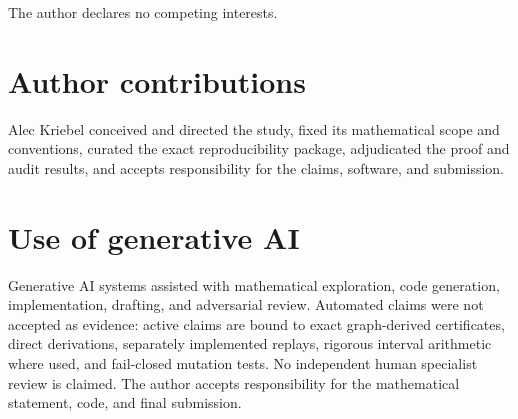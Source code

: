 \documentclass[11pt]{article}
\theoremstyle{remark}
\newcommand{\1}{\mathbf 1}
\begin{document}
The author declares no competing interests.

\section*{Author contributions}

Alec Kriebel conceived and directed the study, fixed its mathematical scope
and conventions, curated the exact reproducibility package, adjudicated the
proof and audit results, and accepts responsibility for the claims,
software, and submission.

\section*{Use of generative AI}

Generative AI systems assisted with mathematical exploration, code
generation, implementation, drafting, and adversarial review.  Automated
claims were not accepted as evidence: active claims are bound to exact
graph-derived certificates, direct derivations, separately implemented
replays, rigorous interval arithmetic where used, and fail-closed mutation
tests.  No independent human specialist review is claimed.  The author
accepts responsibility for the mathematical statement, code, and final
submission.

{\small
\raggedright


}
\end{document}
